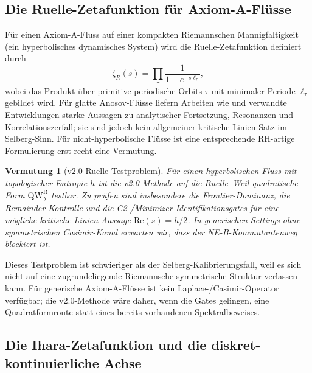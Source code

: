 \documentclass[12pt,a4paper]{article}
\newtheorem{conjecture}[theorem]{Vermutung}
\theoremstyle{definition}
\theoremstyle{remark}
\newcommand{\QW}{\mathrm{QW}}
\begin{document}
\subsection{\texorpdfstring{Die Ruelle-Zetafunktion für Axiom-A-Flüsse}{Die Ruelle-Zetafunktion fuer Axiom-A-Fluesse}}

Für einen Axiom-A-Fluss auf einer kompakten Riemannschen Mannigfaltigkeit (ein hyperbolisches dynamisches
System) wird die Ruelle-Zetafunktion definiert durch
\begin{equation}
\zeta_R(s) = \prod_\tau \frac{1}{1 - e^{-s\ell_\tau}},
\end{equation}
wobei das Produkt über primitive periodische Orbits $\tau$ mit minimaler
Periode $\ell_\tau$ gebildet wird. Für glatte Anosov-Flüsse liefern Arbeiten
wie \cite{Dolgopyat1998} und verwandte Entwicklungen starke Aussagen zu
analytischer Fortsetzung, Resonanzen und Korrelationszerfall; sie sind jedoch
kein allgemeiner kritische-Linien-Satz im Selberg-Sinn. Für
nicht-hyperbolische Flüsse ist eine entsprechende RH-artige Formulierung erst
recht eine Vermutung.

\begin{conjecture}[v2.0 Ruelle-Testproblem]
\label{conj:Ruelle}
Für einen hyperbolischen Fluss mit topologischer Entropie $h$ ist die v2.0-Methode auf
die Ruelle--Weil quadratische Form $\QW^\mathrm{R}_\lambda$ testbar. Zu prüfen
sind insbesondere die Frontier-Dominanz, die Remainder-Kontrolle und die
C2-/Minimizer-Identifikationsgates für eine mögliche kritische-Linien-Aussage
$\mathrm{Re}(s)=h/2$. In generischen Settings ohne symmetrischen Casimir-Kanal
erwarten wir, dass der NE-B-Kommutantenweg blockiert ist.
\end{conjecture}

Dieses Testproblem ist schwieriger als der Selberg-Kalibrierungsfall, weil es
sich nicht auf eine zugrundeliegende Riemannsche symmetrische Struktur verlassen
kann. Für generische Axiom-A-Flüsse ist kein Laplace-/Casimir-Operator
verfügbar; die v2.0-Methode wäre daher, wenn die Gates gelingen, eine
Quadratformroute statt eines bereits vorhandenen Spektralbeweises.

\subsection{\texorpdfstring{Die Ihara-Zetafunktion und die diskret-kontinuierliche Achse}{Die Ihara-Zetafunktion und die diskret-kontinuierliche Achse}}
\label{sec:ihara}
\end{document}
